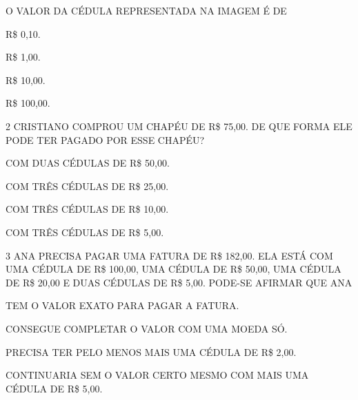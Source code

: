 O VALOR DA CÉDULA REPRESENTADA NA IMAGEM É DE


\begin{escolha}
\item R\$ 0,10.

\item R\$ 1,00.

\item R\$ 10,00.

\item R\$ 100,00.
\end{escolha}


\pagebreak
\num{2} CRISTIANO COMPROU UM CHAPÉU DE R\$ 75,00. DE QUE FORMA ELE PODE TER PAGADO POR ESSE CHAPÉU?

\begin{escolha}
\item COM DUAS CÉDULAS DE R\$ 50,00.

\item COM TRÊS CÉDULAS DE R\$ 25,00.

\item COM TRÊS CÉDULAS DE R\$ 10,00.

\item COM TRÊS CÉDULAS DE R\$ 5,00.
\end{escolha}




\num{3} ANA PRECISA PAGAR UMA FATURA DE R\$ 182,00. ELA ESTÁ COM UMA CÉDULA DE R\$ 100,00, UMA CÉDULA DE R\$ 50,00, UMA CÉDULA DE R\$ 20,00 E DUAS CÉDULAS DE R\$ 5,00. PODE-SE AFIRMAR QUE ANA

\begin{escolha}
\item TEM O VALOR EXATO PARA PAGAR A FATURA.

\item CONSEGUE COMPLETAR O VALOR COM UMA MOEDA SÓ.

\item PRECISA TER PELO MENOS MAIS UMA CÉDULA DE R\$ 2,00.

\item CONTINUARIA SEM O VALOR CERTO MESMO COM MAIS UMA CÉDULA DE R\$ 5,00.
\end{escolha}

